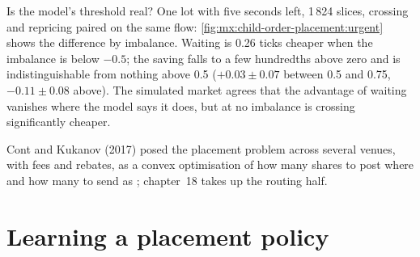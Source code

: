 Is the model's threshold real? One lot with five seconds left, 1\,824 slices, crossing and repricing paired on the same flow:
\cref{fig:mx:child-order-placement:urgent} shows the difference by imbalance. Waiting is 0.26 ticks cheaper when the imbalance is below $-0.5$; the
saving falls to a few hundredths above zero and is indistinguishable from nothing above 0.5 ($+0.03\pm0.07$ between 0.5 and 0.75, $-0.11\pm0.08$
above). The simulated market agrees that the advantage of waiting vanishes where the model says it does, but at no imbalance is crossing significantly
cheaper.

\begin{omfigure}

\label{fig:mx:child-order-placement:urgent}
\end{omfigure}

Cont and Kukanov (2017) posed the placement problem across several venues, with fees and rebates, as a convex optimisation of how many shares to post
where and how many to send as ; chapter~18 takes up the routing half.

\section{Learning a placement policy}

